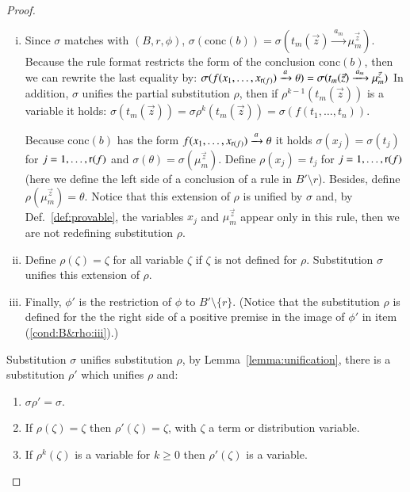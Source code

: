 \documentclass[submission,copyright,creativecommons]{eptcs}
\newcommand{\trans}[1][]{\xrightarrow{\, {#1} \, }}
\newcommand{\rank}{\mathop{\sf r}}
\newcommand{\conc}[1]{\textrm{conc}(#1)}
\begin{document}
\begin{proof}
\begin{enumerate}[(i)]
\item \label{cond:B&rho:iii}Since $\sigma$ matches with $(B, r, \phi)$, $\sigma(\conc{b}) = \sigma(t_m(\vec{z}) \trans[a_m] \mu_{m}^{\vec{z}})$. 
 Because the rule format restricts the form of the conclusion $\conc{b}$, 
 then we can rewrite the last equality by:
  $
  \sigma(f(x_1,\ldots,x_{\rank(f)}) \trans[a] \theta
) =
  \sigma(t_m(\vec{z}) \trans[a_m] \mu_{m}^{\vec{z}})
  $
In addition, $\sigma$ unifies the partial substitution $\rho$,
 then if $\rho^{k-1} (t_m(\vec{z}))$ is a variable it holds:
 $\sigma(t_m(\vec{z})) = \sigma \rho^k (t_m(\vec{z})) = \sigma(f(t_1, \dots, t_n)). $

 Because $\conc{b}$ has the form $f(x_1,\ldots,x_{\rank(f)}) \trans[a] \theta$ 
 it holds $\sigma(x_j) = \sigma(t_j)$ for $j = 1, \dots, \rank(f)$ and 
 $\sigma(\theta) =  \sigma(\mu_m^{\vec{z}})$.
Define $\rho(x_j) = t_j $ for $j = 1, \dots, \rank(f)$
 (here we define the left side of a conclusion of a rule in $B'\setminus r$).   
Besides, define $\rho(\mu_m^{\vec{z}}) = \theta$.
Notice that this extension of $\rho$ is unified by $\sigma$ and, 
 by Def.~\ref{def:provable}, the variables $x_j$ and $\mu_m^{\vec{z}}$ 
 appear only in this rule, then we are not redefining substitution $\rho$.
\item Define $\rho(\zeta) = \zeta$ for all variable $\zeta$
 if $\zeta$ is not defined for $\rho$. 
 Substitution $\sigma$ unifies this extension of $\rho$.
\item Finally, $\phi'$ is the restriction of $\phi$ to $B'\setminus\{r\}$.  
(Notice that the substitution $\rho$ is defined for the the right side 
of a positive premise in the image of $\phi'$ in item (\ref{cond:B&rho:iii}).)


\end{enumerate}

Substitution $\sigma$ unifies substitution $\rho$, by Lemma~\ref{lemma:unification},
there is a substitution $\rho'$ which unifies $\rho$ and:
\begin{enumerate}[($\rho'$i)]
 \item \label{unification:i} 
 $\sigma \rho' = \sigma$.
 \item \label{unification:ii}
 If $\rho(\zeta) = \zeta$ then $\rho'(\zeta) = \zeta$, with  $\zeta$ a term or distribution variable.
\item \label{unification:iii} 
 If $\rho^k(\zeta)$ is a variable for $k \geq 0$ then $\rho'(\zeta)$ is a variable. 
\end{enumerate}
 

\end{proof}
\end{document}
